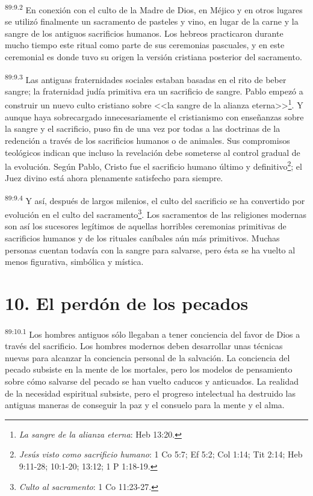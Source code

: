 \par
\textsuperscript{89:9.2} En conexión con el culto de la Madre de Dios, en Méjico y en otros lugares se utilizó finalmente un sacramento de pasteles y vino, en lugar de la carne y la sangre de los antiguos sacrificios humanos. Los hebreos practicaron durante mucho tiempo este ritual como parte de sus ceremonias pascuales, y en este ceremonial es donde tuvo su origen la versión cristiana posterior del sacramento.

\par
\textsuperscript{89:9.3} Las antiguas fraternidades sociales estaban basadas en el rito de beber sangre; la fraternidad judía primitiva era un sacrificio de sangre. Pablo empezó a construir un nuevo culto cristiano sobre <<la sangre de la alianza eterna>>\footnote{\textit{La sangre de la alianza eterna}: Heb 13:20.}. Y aunque haya sobrecargado innecesariamente el cristianismo con enseñanzas sobre la sangre y el sacrificio, puso fin de una vez por todas a las doctrinas de la redención a través de los sacrificios humanos o de animales. Sus compromisos teológicos indican que incluso la revelación debe someterse al control gradual de la evolución. Según Pablo, Cristo fue el sacrificio humano último y definitivo\footnote{\textit{Jesús visto como sacrificio humano}: 1 Co 5:7; Ef 5:2; Col 1:14; Tit 2:14; Heb 9:11-28; 10:1-20; 13:12; 1 P 1:18-19.}; el Juez divino está ahora plenamente satisfecho para siempre.

\par
\textsuperscript{89:9.4} Y así, después de largos milenios, el culto del sacrificio se ha convertido por evolución en el culto del sacramento\footnote{\textit{Culto al sacramento}: 1 Co 11:23-27.}. Los sacramentos de las religiones modernas son así los sucesores legítimos de aquellas horribles ceremonias primitivas de sacrificios humanos y de los rituales caníbales aún más primitivos. Muchas personas cuentan todavía con la sangre para salvarse, pero ésta se ha vuelto al menos figurativa, simbólica y mística.

\section*{10. El perdón de los pecados}
\par
\textsuperscript{89:10.1} Los hombres antiguos sólo llegaban a tener conciencia del favor de Dios a través del sacrificio. Los hombres modernos deben desarrollar unas técnicas nuevas para alcanzar la conciencia personal de la salvación. La conciencia del pecado subsiste en la mente de los mortales, pero los modelos de pensamiento sobre cómo salvarse del pecado se han vuelto caducos y anticuados. La realidad de la necesidad espiritual subsiste, pero el progreso intelectual ha destruido las antiguas maneras de conseguir la paz y el consuelo para la mente y el alma.

